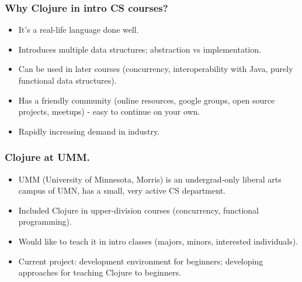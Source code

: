 \documentclass{beamer}
\begin{document}
\begin{frame}
\frametitle{Why Clojure in intro CS courses?}
\begin{itemize}
\item It's a real-life language done well. 
\item Introduces multiple data structures; abstraction vs implementation. 
\item Can be used in later courses  (concurrency, interoperability with Java, purely functional data structures). 
\item Has a friendly community (online resources, google groups, open source projects, meetups) - easy to continue on your own. 
\item Rapidly increasing demand in industry. 
\end{itemize}
\end{frame}

\begin{frame}
\frametitle{Clojure at UMM.}
\begin{itemize}
\item UMM (University of Minnesota, Morris) is an undergrad-only liberal arts campus of UMN, has a small, very active CS department. 
\item Included Clojure in upper-division courses (concurrency, functional programming). 
\item Would like to teach it in intro classes (majors, minors, interested individuals).
\item Current project: development environment for beginners; developing approaches for teaching Clojure to beginners. 
\end{itemize}
\end{frame}
\end{document}

